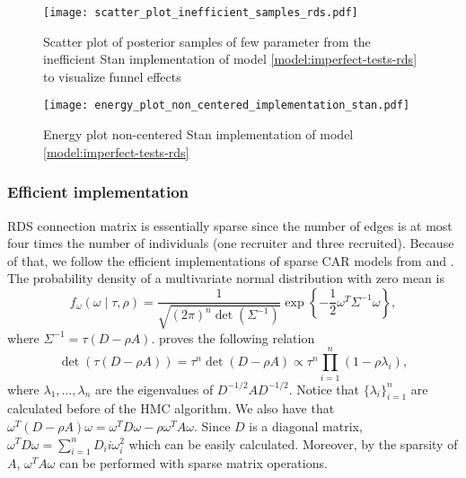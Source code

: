 \begin{figure}[htb]
  \centering
  \caption{\label{fig:scatter_plot_inefficient_samples_rds}Scatter plot
    of posterior samples of few parameter from the inefficient Stan implementation of model
    \eqref{model:imperfect-tests-rds} to visualize funnel effects}
  \texttt{[image: scatter\_plot\_inefficient\_samples\_rds.pdf]}
\end{figure}

\begin{figure}[htb]
  \centering
  \caption{\label{fig:energy_plot_non_centered_implementation_stan}Energy plot
    non-centered Stan implementation of model \eqref{model:imperfect-tests-rds}}
  \texttt{[image: energy\_plot\_non\_centered\_implementation\_stan.pdf]}
\end{figure}

\subsubsection*{Efficient implementation}

RDS connection matrix is essentially sparse since the number of edges is at
most four times the number of individuals (one recruiter and three
recruited). Because of that, we follow the efficient implementations of sparse
CAR models
from \textcite{donegan2021spatial} and \textcite{exactcar}. The probability
density of a multivariate normal distribution with zero mean is
\begin{equation}
  \label{eq:multivariate_normal}
  f_{\omega}(\omega \mid \tau, \rho) = \frac{1}{\sqrt{(2\pi)^n\det(\Sigma^{-1})}
  }\exp\left\{-\frac{1}{2}\omega^T\Sigma^{-1}\omega\right\},
\end{equation}
where $\Sigma^{-1} = \tau(D - \rho A)$. \textcite[p. 955]{jin2005generalized}
proves the following relation
$$
  \det(\tau(D - \rho A)) = \tau^n \det(D - \rho A) \propto \tau^n \prod_{i=1}^n (1 - \rho \lambda_i),
$$
where $\lambda_1, \dots, \lambda_n$ are the eigenvalues of $D^{-1/2} A
  D^{-1/2}$. Notice that $\{\lambda_i\}_{i=1}^n$ are calculated before of the
HMC algorithm. We also have that $\omega^T(D - \rho A)\omega = \omega^T D \omega - \rho \omega^T A
  \omega$. Since $D$ is a diagonal matrix, $\omega^T D \omega = \sum_{i=1}^n
  D_ii\omega_i^2$ which can be easily calculated. Moreover, by the sparsity of $A$,
$\omega^T A \omega$ can be performed with sparse matrix operations.


